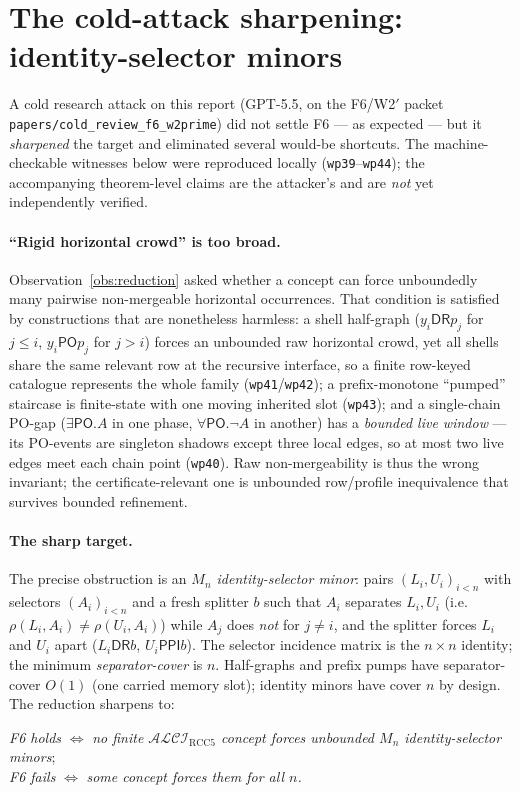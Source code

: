 \documentclass[11pt]{article}
\newcommand{\ALCIRCC}{\mathcal{ALCI}_{\mathrm{RCC5}}}
\newcommand{\code}[1]{\texttt{#1}}
\newcommand{\DR}{\mathsf{DR}}
\newcommand{\PO}{\mathsf{PO}}
\newcommand{\PPI}{\mathsf{PPI}}
\theoremstyle{plain}
\theoremstyle{definition}
\begin{document}
\section{The cold-attack sharpening: identity-selector minors}\label{sec:sharpen}

A cold research attack on this report (GPT-5.5, on the F6/W2$'$ packet
\code{papers/cold\_review\_f6\_w2prime}) did not settle F6 --- as
expected --- but it \emph{sharpened} the target and eliminated several
would-be shortcuts. The machine-checkable witnesses below were
reproduced locally (\code{wp39}--\code{wp44}); the accompanying
theorem-level claims are the attacker's and are \emph{not} yet
independently verified.

\paragraph{``Rigid horizontal crowd'' is too broad.}
Observation~\ref{obs:reduction} asked whether a concept can force
unboundedly many pairwise non-mergeable horizontal occurrences. That
condition is satisfied by constructions that are nonetheless harmless:
a shell half-graph ($y_i\mathbin{\DR}p_j$ for $j\le i$,
$y_i\mathbin{\PO}p_j$ for $j>i$) forces an unbounded raw horizontal
crowd, yet all shells share the same relevant row at the recursive
interface, so a finite row-keyed catalogue represents the whole family
(\code{wp41}/\code{wp42}); a prefix-monotone ``pumped'' staircase is
finite-state with one moving inherited slot (\code{wp43}); and a
single-chain PO-gap ($\exists\PO.A$ in one phase, $\forall\PO.\neg A$ in
another) has a \emph{bounded live window} --- its PO-events are singleton
shadows except three local edges, so at most two live edges meet each
chain point (\code{wp40}). Raw non-mergeability is thus the wrong
invariant; the certificate-relevant one is unbounded row/profile
inequivalence that survives bounded refinement.

\paragraph{The sharp target.}
The precise obstruction is an \emph{$M_n$ identity-selector minor}: pairs
$(L_i,U_i)_{i<n}$ with selectors $(A_i)_{i<n}$ and a fresh splitter $b$
such that $A_i$ separates $L_i,U_i$ (i.e.\ $\rho(L_i,A_i)\neq
\rho(U_i,A_i)$) while $A_j$ does \emph{not} for $j\neq i$, and the
splitter forces $L_i$ and $U_i$ apart ($L_i\mathbin{\DR}b$,
$U_i\mathbin{\PPI}b$). The selector incidence matrix is the $n\times n$
identity; the minimum \emph{separator-cover} is $n$. Half-graphs and
prefix pumps have separator-cover $O(1)$ (one carried memory slot);
identity minors have cover $n$ by design. The reduction sharpens to:
\begin{center}
\emph{F6 holds} $\iff$ \emph{no finite $\ALCIRCC$ concept forces
unbounded $M_n$ identity-selector minors};\\
\emph{F6 fails} $\iff$ \emph{some concept forces them for all $n$.}
\end{center}
\end{document}
